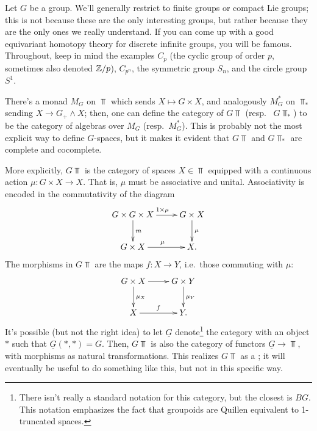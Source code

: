 \orbreak

Let $G$ be a group. We'll generally restrict to finite groups or compact Lie groups; this is not because these are
the only interesting groups, but rather because they are the only ones we really understand. If you can come up
with a good equivariant homotopy theory for discrete infinite groups, you will be famous. Throughout, keep in mind
the examples $C_p$ (the cyclic group of order $p$, sometimes also denoted $\mathbb Z/p$), $C_{p^n}$, the symmetric group
$S_n$, and the circle group $S^1$.

There's a monad $M_G$ on $\Top$ which sends $X\mapsto G\times X$, and analogously $M_G^*$ on $\Top_*$ sending $X\to
G_+\land X$; then, one can define the category of  $G\Top$ (resp.\ 
$G\Top_*$) to be the category of algebras over $M_G$ (resp.\ $M_G^*$). This is probably not the most explicit way
to define $G$-spaces, but it makes it evident that $G\Top$ and $G\Top_*$ are complete and cocomplete.

More explicitly, $G\Top$ is the category of spaces $X\in\Top$ equipped with a continuous action $\mu\colon G\times
X\to X$. That is, $\mu$ must be associative and unital. Associativity is encoded in the commutativity of the
diagram
\[\xymatrix{
	G\times G\times X\ar[r]^{1\times\mu}\ar[d]^m & G\times X\ar[d]^\mu\\
	G\times X\ar[r]^\mu & X.
}\]
The morphisms in $G\Top$ are the  maps $f\colon X\to Y$, i.e.\ those commuting with $\mu$:
\[\xymatrix{
	G\times X\ar[r]\ar[d]^{\mu_X} & G\times Y\ar[d]^{\mu_Y}\\
	X\ar[r]^f & Y.
}\]
It's possible (but not the right idea) to let $\underline G$ denote\footnote{There isn't really a standard notation for this category, but the closest is $BG$. This notation emphasizes the fact that groupoids are Quillen equivalent to 1-truncated spaces.} the category with an object $*$ such that
$\underline G(*, *) = G$. Then, $G\Top$ is also the category of functors $\underline G\to\Top$, with morphisms as
natural transformations. This realizes $G\Top$ as a ; it will eventually be useful to do
something like this, but not in this specific way.

